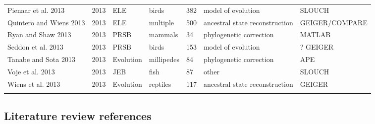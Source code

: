 \begin{landscape}
\begin{center}
\begin{longtable}{p{6cm}llllll}
Pienaar et al. 2013   &   2013    &   ELE &   birds   &   382 &   model of evolution  &   SLOUCH  \\
Quintero and Wiens 2013   &   2013    &   ELE &   multiple    &   500 &   ancestral state reconstruction  &   GEIGER/COMPARE  \\
Ryan and Shaw 2013    &   2013    &   PRSB    &   mammals &   34  &   phylogenetic correction &   MATLAB  \\
Seddon et al. 2013    &   2013    &   PRSB    &   birds   &   153 &   model of evolution  &   ? GEIGER  \\
Tanabe and Sota 2013  &   2013    &   Evolution   &   millipedes  &   84  &   phylogenetic correction &   APE \\
Voje et al. 2013  &   2013    &   JEB &   fish    &   87  &   other   &   SLOUCH  \\
Wiens et al. 2013 &   2013    &   Evolution   &   reptiles    &   117 &   ancestral state reconstruction  &   GEIGER  \\
\hline
\label{table:litreview}
\end{longtable}
\end{center}
\end{landscape}
   
\subsection{Literature review references}

